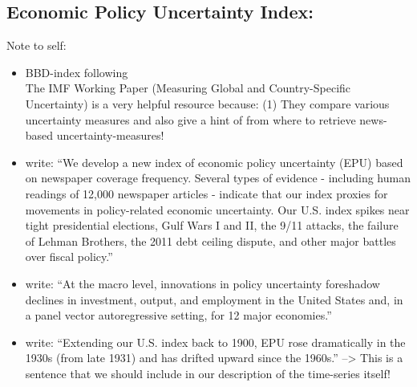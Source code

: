 \documentclass[a4paper,12pt,oneside,pointednumbers,bibtotoc,bigheadings,liststotoc]{scrbook}
\begin{document}
\subsection{Economic Policy Uncertainty Index: \citet{bakeretal:15}}
\label{sec:epuindex}

\begingroup
    \fontsize{8pt}{12pt}\selectfont
    Note to self:
\begin{itemize}
	\item  BBD-index following \citet{bakeretal:15}\\
The IMF Working Paper (Measuring Global and Country-Specific Uncertainty) is a very helpful resource because: (1) They compare various uncertainty measures and also give a hint of from where to retrieve news-based uncertainty-measures!
	\item \citet[p. 1593]{bakeretal:16} write: ``We develop a new index of economic policy uncertainty (EPU) based on newspaper coverage frequency. Several types of evidence - including human readings of 12,000 newspaper articles - indicate that our index proxies for movements in policy-related economic uncertainty. Our U.S. index spikes near tight presidential elections, Gulf Wars I and II, the 9/11 attacks, the failure of Lehman Brothers, the 2011 debt ceiling dispute, and other major battles over fiscal policy.''
	\item \citet[p. 1593]{bakeretal:16} write: ``At the macro level, innovations in policy uncertainty foreshadow declines in investment, output, and employment in the United States and, in a panel vector autoregressive setting, for 12 major economies.''
	\item \citet[p. 1593]{bakeretal:16} write: ``Extending our U.S. index back to 1900, EPU rose dramatically in the 1930s (from late 1931) and has drifted upward since the 1960s.'' --> This is a sentence that we should include in our description of the time-series itself!
\end{itemize}
\endgroup
\end{document}
